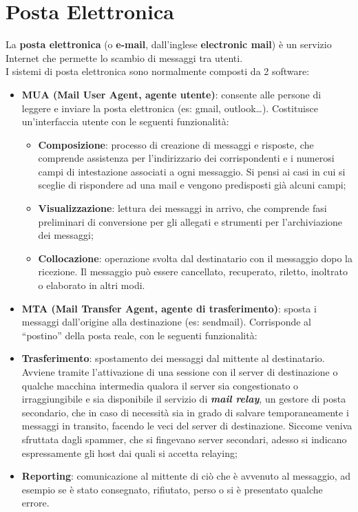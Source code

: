 \section{Posta Elettronica}
La \textbf{posta elettronica} (o \textbf{e-mail}, dall’inglese \textbf{electronic mail}) è un servizio Internet che
permette lo scambio di messaggi tra utenti.\\

I sistemi di posta elettronica sono normalmente composti da 2 software:
\begin{itemize}
    \item \textbf{MUA (Mail User Agent, agente utente)}: consente alle persone di leggere e inviare la
posta elettronica (es: gmail, outlook…).
Costituisce un’interfaccia utente con le seguenti funzionalità:
    \begin{itemize}
        \item \textbf{Composizione}: processo di creazione di messaggi e risposte, che comprende
        assistenza per l’indirizzario dei corrispondenti e i numerosi campi di
        intestazione associati a ogni messaggio. Si pensi ai casi in cui si sceglie di
        rispondere ad una mail e vengono predisposti già alcuni campi;
        \item \textbf{Visualizzazione}: lettura dei messaggi in arrivo, che comprende fasi preliminari
        di conversione per gli allegati e strumenti per l’archiviazione dei messaggi;
        \item \textbf{Collocazione}: operazione svolta dal destinatario con il messaggio dopo la
        ricezione. Il messaggio può essere cancellato, recuperato, riletto, inoltrato o
        elaborato in altri modi.
    \end{itemize}

    \item \textbf{MTA (Mail Transfer Agent, agente di trasferimento)}: sposta i messaggi dall’origine
    alla destinazione (es: sendmail).
    Corrisponde al “postino” della posta reale, con le seguenti funzionalità:
    \item \textbf{Trasferimento}: spostamento dei messaggi dal mittente al destinatario. Avviene
    tramite l’attivazione di una sessione con il server di destinazione o qualche
    macchina intermedia qualora il server sia congestionato o irraggiungibile e sia
    disponibile il servizio di \textbf{\textit{mail relay}}, un gestore di posta secondario, che in caso
    di necessità sia in grado di salvare temporaneamente i messaggi in transito,
    facendo le veci del server di destinazione. Siccome veniva sfruttata dagli
    spammer, che si fingevano server secondari, adesso si indicano espressamente
    gli host dai quali si accetta relaying;
    \item \textbf{Reporting}: comunicazione al mittente di ciò che è avvenuto al messaggio, ad
    esempio se è stato consegnato, rifiutato, perso o si è presentato qualche errore.
\end{itemize}

